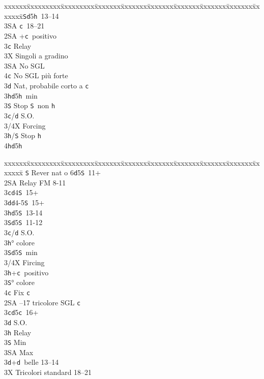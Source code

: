 \documentclass[a4paper,italian]{article}
\newcommand{\BS}{\small{\texttt{S}}}
\newcommand{\BC}{\small{\texttt{c}}}
\newcommand{\BD}{\small{\texttt{d}}}
\newcommand{\BH}{\small{\texttt{h}}}
\newenvironment{bidtable}
{\begin{tabbing}

    xxxxxx\=xxxxxxxxx\=xxxxxxxxx\=xxxxxxx\=xxxxxxx\=xxxxxxx\=xxxxxxx\=xxxxxxx\=xxxxxxx\=xxxxxxx\=\kill}
{\end{tabbing} }%
\begin{document}
\begin{multicols}{2}
\begin{bidtable}
        3\BS {}\BD 5\BH\ 13--14\\
        3\small{SA} \BC\ 18--21\-\\
        2\small{SA} +\BC\ positivo\+\\
        3\BC \> Relay\+\\
        3X \> Singoli a gradino\\
        3\small{SA} \> No SGL\\
        4\BC \> No SGL più forte\-\\
        3\BD \> Nat, probabile corto a \BC \\
        3\BH {}\BD 5\BH\ min\\
        3\BS \> Stop \BS\ non \BH \-\\
        3\BC/\BD \> S.O.\+\\
        3/4X \> Forcing\\
        3\BH/\BS \> Stop \BH \\
        4\BH {}\BD 5\BH \-\-\\
    \end{bidtable}
    \columnbreak
    \begin{bidtable}
        \BS \> Rever nat o 6\BD 5\BS\ 11+\+\+\\
        2\small{SA} \> Relay FM 8-11\+\\
        3\BC {}\BD 4\BS\ 15+\\
        3\BD {}\BD 4-5\BS\ 15+\\
        3\BH {}\BD 5\BS\ 13-14\\
        3\BS {}\BD 5\BS\ 11-12\-\\
        3\BC/\BD \> S.O.\+\\
        3\BH {}° colore\\
        3\BS {}\BD 5\BS\ min\\
        3/4X \> Fircing\-\\
        3\BH {}+\BC\ positivo\+\\
        3\BS {}° colore\\
        4\BC \> Fix \BC \-\-\\
        2\small{SA} --17 tricolore SGL \BC \\
        3\BC {}\BD 5\BC\ 16+\+\\
        3\BD \> S.O.\\
        3\BH \> Relay\+\\
        3\BS \> Min\\
        3\small{SA} \> Max\-\-\\
        3\BD {}+\BD\ belle 13--14\\
        3X \> Tricolori standard 18--21
    \end{bidtable}

\end{multicols}
\end{document}
